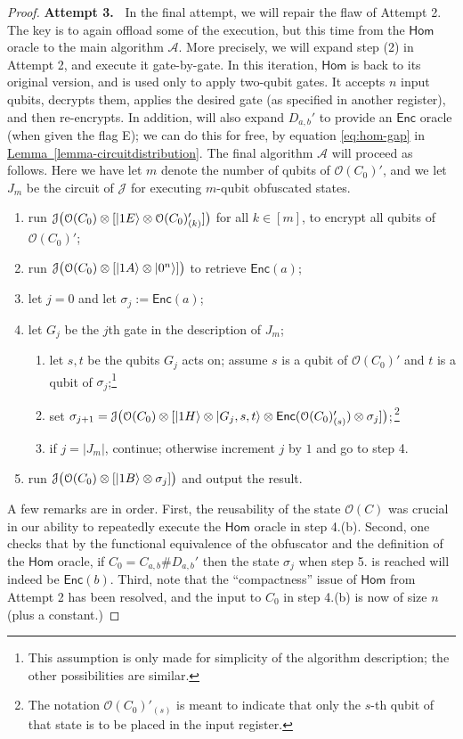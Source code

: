 \documentclass[11pt]{article}
\numberwithin{equation}{section}
\newcommand{\expref}[2]{\texorpdfstring{\hyperref[#2]{#1~\ref{#2}}}{#1~\ref{#2}}}
\newcommand{\algo}{\mathcal}
\newcommand{\Enc}{\ensuremath{\mathsf{Enc}}\xspace}
\newcommand{\Homorcl}{\ensuremath{\mathsf{Hom}}\xspace}
\begin{document}
{\begin{proof}
\textbf{Attempt 3.~} In the final attempt, we will repair the flaw of Attempt 2. The key is to again offload some of the execution, but this time from the $\Homorcl$ oracle to the main algorithm $\algo A$. More precisely, we will expand step (2) in Attempt 2, and execute it gate-by-gate. In this iteration, $\Homorcl$ is back to its original version, and is used only to apply two-qubit gates. It accepts $n$ input qubits, decrypts them, applies the desired gate (as specified in another register), and then re-encrypts. In addition, will also expand $D_{a, b}'$ to provide an $\Enc$ oracle (when given the flag E); we can do this for free, by equation \eqref{eq:hom-gap} in \expref{Lemma}{lemma-circuitdistribution}. The final algorithm $\algo A$ will proceed as follows. Here we have let $m$ denote the number of qubits of $\algo O(C_0)'$, and we let $J_m$ be the circuit of $\algo J$ for executing $m$-qubit obfuscated states.
\begin{enumerate}
\item run $\algo J \bigl( \algo O(C_0) \otimes [\ket{1E} \otimes \algo O(C_0)'_{(k)}]\bigr)$ for all $k \in [m]$, to encrypt all qubits of $\algo O(C_0)'$; 
\item run $\algo J \bigl( \algo O(C_0) \otimes [\ket{1A} \otimes \ket{0^n}]\bigr)$ to retrieve $\Enc(a)$;
\item let $j = 0$ and let $\sigma_j := \Enc(a)$;
\item let $G_j$ be the $j$th gate in the description of $J_m$;
\begin{enumerate}
\item let $s, t$ be the qubits $G_j$ acts on; assume $s$ is a qubit of $\algo O(C_0)'$ and $t$ is a qubit of $\sigma_j$;\footnote{This assumption is only made for simplicity of the algorithm description; the other possibilities are similar.}
\item set $\sigma_{j+1} = \algo J \bigl( \algo O(C_0) \otimes [\ket{1H} \otimes \ket{G_j, s, t} \otimes \Enc(\algo O(C_0)'_{(s)}) \otimes \sigma_j]\bigr)$;\,\footnote{The notation $\algo O(C_0)'_{(s)}$ is meant to indicate that only the $s$-th qubit of that state is to be placed in the input register.}
\item if $j = |J_m|$, continue; otherwise increment $j$ by $1$ and go to step 4.
\end{enumerate}
\item run $\algo J \bigl( \algo O(C_0) \otimes [\ket{1B} \otimes \sigma_j]\bigr)$ and output the result.
\end{enumerate}
A few remarks are in order. First, the reusability of the state $\algo O(C)$ was crucial in our ability to repeatedly execute the $\Homorcl$ oracle in step 4.(b). Second, one checks that by the functional equivalence of the obfuscator and the definition of the $\Homorcl$ oracle, if $C_0 = C_{a, b} \# D_{a, b}'$ then the state $\sigma_j$ when step 5. is reached will indeed be $\Enc(b)$. Third, note that the ``compactness'' issue of $\Homorcl$ from Attempt 2 has been resolved, and the input to $C_0$ in step 4.(b) is now of size $n$ (plus a constant.) 


\end{proof}}
\end{document}
